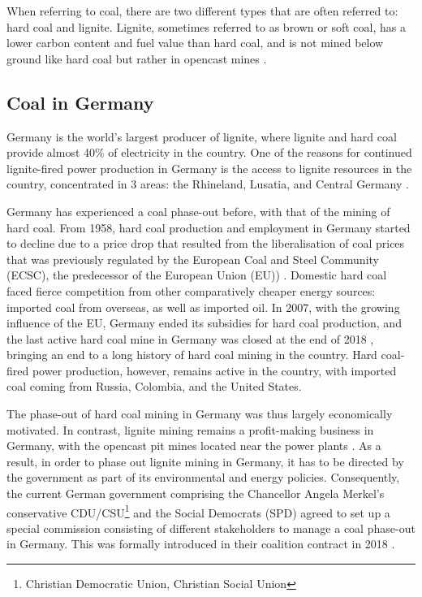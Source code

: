 \documentclass[12pt,onecolumn,twoside]{layout}
\begin{document}
When referring to coal, there are two different types that are often referred to: hard coal and lignite. Lignite, sometimes referred to as brown or soft coal, has a lower carbon content and fuel value than hard coal, and is not mined below ground like hard coal but rather in opencast mines \cite{Appunn2019}. 

\subsection*{Coal in Germany}
Germany is the world's largest producer of lignite, where lignite and hard coal provide almost 40\% of electricity in the country. One of the reasons for continued lignite-fired power production in Germany is the access to lignite resources in the country, concentrated in 3 areas: the Rhineland, Lusatia, and Central Germany \cite{AgoraEnergiewende2019}. 

Germany has experienced a coal phase-out before, with that of the mining of hard coal. From 1958, hard coal production and employment in Germany started to decline due to a price drop that resulted from the liberalisation of coal prices that was previously regulated by the European Coal and Steel Community (ECSC), the predecessor of the European Union (EU)) \cite{Oei2019}. Domestic hard coal faced fierce competition from other comparatively cheaper energy sources: imported coal from overseas, as well as imported oil.  In 2007, with the growing influence of the EU, Germany ended its subsidies for hard coal production, and the last active hard coal mine in Germany was closed at the end of 2018 \cite{Appunn2018}, bringing an end to a long history of hard coal mining in the country. Hard coal-fired power production, however, remains active in the country, with imported coal coming from Russia, Colombia, and the United States. 

The phase-out of hard coal mining in Germany was thus largely economically motivated. In contrast, lignite mining remains a profit-making business in Germany, with the opencast pit mines located near the power plants \cite{Appunn2019}. As a result, in order to phase out lignite mining in Germany, it has to be directed by the government as part of its environmental and energy policies. Consequently, the current German government comprising the Chancellor Angela Merkel's conservative CDU/CSU\footnote{Christian Democratic Union, Christian Social Union} and the Social Democrats (SPD) agreed to set up a special commission consisting of different stakeholders to manage a coal phase-out in Germany. This was formally introduced in their coalition contract in 2018 \cite{Wehrmann2018}.  
\end{document}
